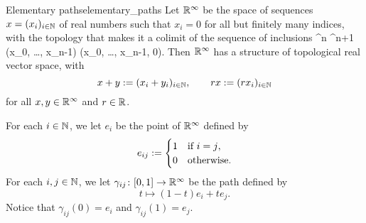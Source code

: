 \begin{ccon}{Elementary paths}{elementary_paths}
	Let \( \mathbb{R}^\infty \) be the space of sequences \( x = (x_i)_{i \in \mathbb{N}} \) of real numbers such that \( x_i = 0 \) for all but finitely many indices, with the topology that makes it a colimit of the sequence of inclusions 
	{ \bbR^n }
	{ \bbR^{n+1} }
	{ (x_0, \ldots, x_{n-1}) }
	{ (x_0, \ldots, x_{n-1}, 0). }
	Then \( \mathbb{R}^\infty \) has a structure of topological real vector space, with
	\begin{equation*}
		x + y := (x_i + y_i)_{i \in \mathbb{N}}, \qquad
		r x := (r x_i)_{i \in \mathbb{N}}
	\end{equation*}
	for all \( x, y \in \mathbb{R}^\infty \) and \( r \in \mathbb{R} \).

	For each \( i \in \mathbb{N} \), we let \( e_i \) be the point of \( \mathbb{R}^\infty \) defined by
	\begin{equation*}
		e_{ij} := \begin{cases}
			1 & \text{if \( i = j \)}, \\
			0 & \text{otherwise}.
		\end{cases}
	\end{equation*}
	For each \( i, j \in \mathbb{N} \), we let \( \gamma_{ij}\colon [0, 1] \to \mathbb{R}^\infty \) be the path defined by
	\begin{equation*}
		t \mapsto (1 - t)e_i + te_j.
	\end{equation*}
	Notice that \( \gamma_{ij}(0) = e_i \) and \( \gamma_{ij}(1) = e_j \).
\end{ccon}


